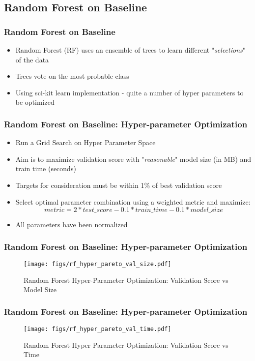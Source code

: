 \documentclass{beamer}
\begin{document}
\subsection{Random Forest on Baseline} %
\begin{frame}
\frametitle{Random Forest on Baseline}
\begin{itemize}
	\item Random Forest (RF) uses an ensemble of trees to learn different "\textit{selections}" of the data
	\item Trees vote on the most probable class
	\item Using sci-kit learn implementation - quite a number of hyper parameters to be optimized
\end{itemize}
\end{frame}

\begin{frame}
\frametitle{Random Forest on Baseline: Hyper-parameter Optimization}
\begin{itemize}
	\item Run a Grid Search on Hyper Parameter Space
	\item Aim is to maximize validation score with "\textit{reasonable}" model size (in MB) and train time (seconds)
	\item Targets for consideration must be within 1\% of best validation score
	\item Select optimal parameter combination using a weighted metric and maximize:
	$$
	metric = 2 * test\_score - 0.1*train\_time - 0.1 * model\_size 
	$$
	\item All parameters have been normalized
\end{itemize}
\end{frame}

\begin{frame}
\frametitle{Random Forest on Baseline: Hyper-parameter Optimization}
\begin{figure}
	\texttt{[image: figs/rf\_hyper\_pareto\_val\_size.pdf]}
	\caption{Random Forest Hyper-Parameter Optimization: Validation Score vs Model Size}
\end{figure}
\end{frame}

\begin{frame}
\frametitle{Random Forest on Baseline: Hyper-parameter Optimization}
\begin{figure}
	\texttt{[image: figs/rf\_hyper\_pareto\_val\_time.pdf]}
	\caption{Random Forest Hyper-Parameter Optimization: Validation Score vs Time}
\end{figure}
\end{frame}
\end{document}
